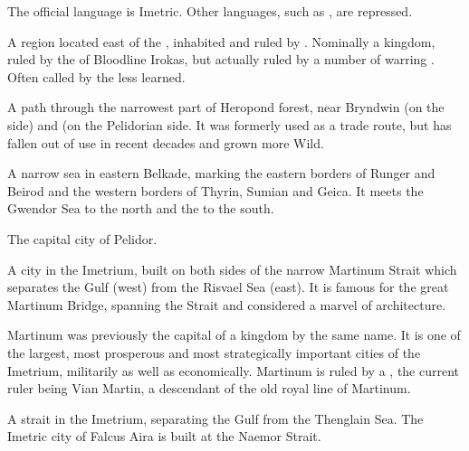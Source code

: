 
The official language is Imetric. Other languages, such as \Samurin, are repressed. 



A region located east of the \Dragonridge, inhabited and ruled by \dragons{}. Nominally a kingdom, ruled by the \DragonKing{} of Bloodline Irokas, but actually ruled by a number of warring \dragonlords{}. 
Often called \quo{\Dragonland} by the less learned. 



A path through the narrowest part of Heropond forest, near Bryndwin (on the \Scyric{} side) and \Redglen{} (on the Pelidorian side. It was formerly used as a trade route, but has fallen out of use in recent decades and grown more Wild. 



A narrow sea in eastern Belkade, marking the eastern borders of Runger and Beirod and the western borders of Thyrin, Sumian and Geica. It meets the Gwendor Sea to the north and the \Risvaelsea{} to the south. 



The capital city of Pelidor. 



A city in the Imetrium, built on both sides of the narrow Martinum Strait which separates the \Samure{} Gulf (west) from the Risvael Sea (east). It is famous for the great Martinum Bridge, spanning the Strait and considered a marvel of architecture. 

Martinum was previously the capital of a kingdom by the same name. It is one of the largest, most prosperous and most strategically important cities of the Imetrium, militarily as well as economically. Martinum is ruled by a \Laccorin{}, the current ruler being Vian Martin, a descendant of the old royal line of Martinum. 



A strait in the Imetrium, separating the \Samure{} Gulf from the Thenglain Sea. The Imetric city of Falcus Aira is built at the Naemor Strait. 



